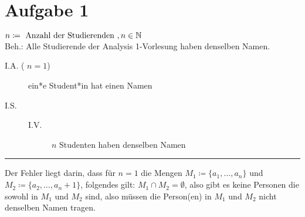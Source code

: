 \documentclass{gadsescript}
\begin{document}
\maketitle
\section{Aufgabe 1}
$ n \coloneqq \text{ Anzahl der Studierenden }, n \in \mathbb{N} $\\
Beh.: Alle Studierende der Analysis 1-Vorlesung haben denselben Namen.\\
\begin{description}
	\item[I.A. ( $ n = 1 $)] ein*e Student*in hat einen Namen
	\item[I.S.]
		\begin{description}
			\item[I.V.] $ n $ Studenten haben denselben Namen
		\end{description}
		
\end{description}

\hrule

Der Fehler liegt darin, dass für $ n = 1 $ die Mengen $ M_1 \coloneqq \{ a_1, \dotsc, a_n \} $ und $ M_2 \coloneqq \{ a_2, \dotsc, a_n+1 \} $, folgendes gilt: $M_1 \cap M_2 = \emptyset$, also gibt es keine Personen die sowohl in $ M_1 $ und $ M_2 $ sind, also müssen die Person(en) in $ M_1 $ und $ M_2 $ nicht denselben Namen tragen.
\end{document}
